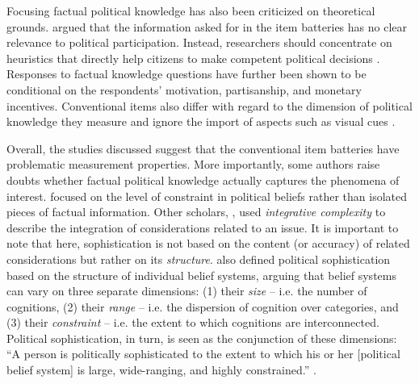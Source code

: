 \documentclass[12pt]{article}
\begin{document}
Focusing factual political knowledge has also been criticized on theoretical grounds. \citet{lupia2006elitism} argued that the information asked for in the item batteries has no clear relevance to political participation. Instead, researchers should concentrate on heuristics that directly help citizens to make competent political decisions \citep[see also][]{lupia1994shortcuts}. Responses to factual knowledge questions have further been shown to be conditional on the respondents' motivation, partisanship, and monetary incentives\citep{prior2008money,bullock2015partisan,prior2015you}. Conventional items also differ with regard to the dimension of political knowledge they measure \citep{barabas2014question} and ignore the import of aspects such as visual cues \citep{prior2014visual}.

Overall, the studies discussed suggest that the conventional item batteries have problematic measurement properties. More importantly, some authors raise doubts whether factual political knowledge actually captures the phenomena of interest. \citet{converse1964nature} focused on the level of constraint in political beliefs rather than isolated pieces of factual information. Other scholars, \citet{tetlock1983cognitive}, used \textit{integrative complexity} to describe the integration of considerations related to an issue. It is important to note that here, sophistication is not based on the content (or accuracy) of related considerations but rather on its \textit{structure}. \citet{luskin1987measuring} also defined political sophistication based on the structure of individual belief systems, arguing that belief systems can vary on three separate dimensions: (1) their \textit{size} -- i.e. the number of cognitions, (2) their \textit{range} -- i.e. the dispersion of cognition over categories, and (3) their \textit{constraint} -- i.e. the extent to which cognitions are interconnected. Political sophistication, in turn, is seen as the conjunction of these dimensions: ``A person is politically sophisticated to the extent to which his or her [political belief system] is large, wide-ranging, and highly constrained.'' \citep[860]{luskin1987measuring}.
\end{document}
